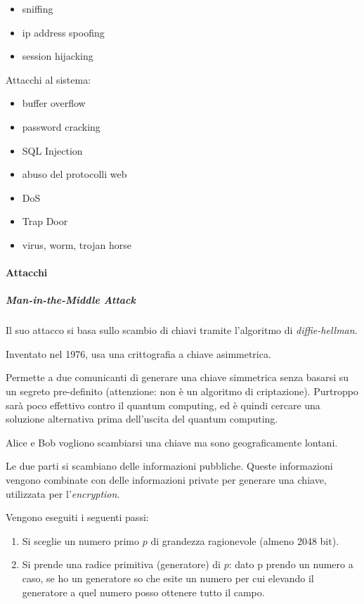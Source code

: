\begin{itemize}
\item sniffing
\item ip address spoofing
\item session hijacking
\end{itemize}

Attacchi al sistema:

\begin{itemize}
\item buffer overflow
\item password cracking
\item SQL Injection
\item abuso del protocolli web
\item DoS
\item Trap Door
\item virus, worm, trojan horse
\end{itemize}

\paragraph{Attacchi}

\subparagraph{Man-in-the-Middle Attack}

Il suo attacco si basa sullo scambio di chiavi tramite l'algoritmo di 
\textit{diffie-hellman}.


Inventato nel 1976, usa una crittografia a chiave asimmetrica.

Permette a due comunicanti di generare una chiave simmetrica senza basarsi su 
un segreto pre-definito (attenzione: non è un algoritmo di criptazione). 
Purtroppo sarà poco effettivo contro il quantum computing, ed è quindi cercare 
una soluzione alternativa prima dell'uscita del quantum computing.



Alice e Bob vogliono scambiarsi una chiave ma sono geograficamente lontani.

Le due parti si scambiano delle informazioni pubbliche. Queste informazioni 
vengono combinate con delle informazioni private per generare una chiave, 
utilizzata per l'\textit{encryption}.


Vengono eseguiti i seguenti passi:

\begin{enumerate}
 \item Si sceglie un numero primo $p$ di grandezza ragionevole (almeno 2048 
 bit).
 \item Si prende una radice primitiva (generatore) di $p$: dato p prendo un 
 numero a caso, se ho un generatore so che esite un numero per cui elevando il 
 generatore a quel numero posso ottenere tutto il campo.
\end{enumerate}

